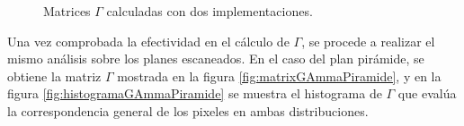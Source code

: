 \begin{figure}[H]
	\centering
	\hfill
	\caption{Matrices $\Gamma$ calculadas con dos implementaciones.}
	\label{fig:barraAtravesaGamma}
\end{figure}

Una vez comprobada la efectividad en el cálculo de $\Gamma$, se procede a realizar el mismo análisis sobre los planes escaneados. En el caso del plan pirámide, se obtiene la matriz $\Gamma$ mostrada en la figura \ref{fig:matrixGAmmaPiramide}, y en la figura \ref{fig:histogramaGAmmaPiramide} se muestra el histograma de $\Gamma$ que evalúa la correspondencia general de los pixeles en ambas distribuciones.\\


